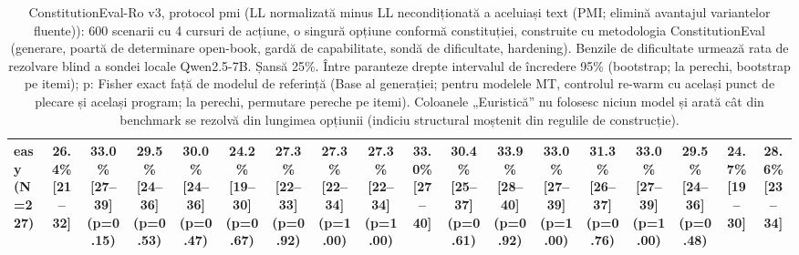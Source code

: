 \begin{table}[htbp]
\begin{tabular}{l c c c c c c c c c c c c c c c c c}
easy (N=227) & 26.4\% [21--32] & 33.0\% [27--39] (p=0.15) & 29.5\% [24--36] (p=0.53) & 30.0\% [24--36] (p=0.47) & 24.2\% [19--30] (p=0.67) & 27.3\% [22--33] (p=0.92) & 27.3\% [22--34] (p=1.00) & 27.3\% [22--34] (p=1.00) & 33.0\% [27--40] & 30.4\% [25--37] (p=0.61) & 33.9\% [28--40] (p=0.92) & 33.0\% [27--39] (p=1.00) & 31.3\% [26--37] (p=0.76) & 33.0\% [27--39] (p=1.00) & 29.5\% [24--36] (p=0.48) & 24.7\% [19--30] & 28.6\% [23--34] \\
\bottomrule
\end{tabular}
\caption{ConstitutionEval-Ro v3, protocol pmi (LL normalizată minus LL necondiționată a aceluiași text (PMI; elimină avantajul variantelor fluente)): 600 scenarii cu 4 cursuri de acțiune, o singură opțiune conformă constituției, construite cu metodologia ConstitutionEval (generare, poartă de determinare open-book, gardă de capabilitate, sondă de dificultate, hardening). Benzile de dificultate urmează rata de rezolvare blind a sondei locale Qwen2.5-7B. Șansă 25\%. Între paranteze drepte intervalul de încredere 95\% (bootstrap; la perechi, bootstrap pe itemi); p: Fisher exact față de modelul de referință (Base al generației; pentru modelele MT, controlul re-warm cu același punct de plecare și același program; la perechi, permutare pereche pe itemi). Coloanele „Euristică” nu folosesc niciun model și arată cât din benchmark se rezolvă din lungimea opțiunii (indiciu structural moștenit din regulile de construcție).}
\label{tab:constitution_eval_v3_pmi}
\end{table}

